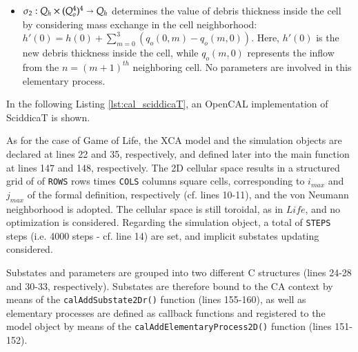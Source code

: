 \begin{itemize}
\begin{itemize}

\item $\sigma_2: Q_h \times (Q_o^4)^4 \shortrightarrow Q_h$ determines
  the value of debris thickness inside the cell by considering mass
  exchange in the cell neighborhood: $h'(0) = h(0) + \sum_{m=0}^3
  (q_o(0,m) - q_o(m,0))$. Here, $h'(0)$ is the new debris
  thickness inside the cell, while $q_o(m,0)$ represents the inflow from
  the $n=(m+1)^{th}$ neighboring cell. No parameters are involved in
  this elementary process.

\end{itemize}
\end{itemize}

In the following Listing \ref{lst:cal_sciddicaT}, an OpenCAL
implementation of SciddicaT is shown.



As for the case of Game of Life, the XCA model and the simulation
objects are declared at lines 22 and 35, respectively, and defined
later into the main function at lines 147 and 148, respectively. The
2D cellular space results in a structured grid of of \verb'ROWS' rows
times \verb'COLS' columns square cells, corresponding to $i_{max}$ and
$j_{max}$ of the formal definition, respectively (cf. lines 10-11),
and the von Neumann neighborhood is adopted. The cellular space is
still toroidal, as in $Life$, and no optimization is
considered. Regarding the simulation object, a total of \verb'STEPS'
steps (i.e. 4000 steps - cf. line 14) are set, and implicit substates
updating considered.

Substates and parameters are grouped into two different C structures
(lines 24-28 and 30-33, respectively). Substates are therefore bound
to the CA context by means of the \verb'calAddSubstate2Dr()' function
(lines 155-160), as well as elementary processes are defined as
callback functions and registered to the model object by means of the
\verb'calAddElementaryProcess2D()' function (lines 151-152).

